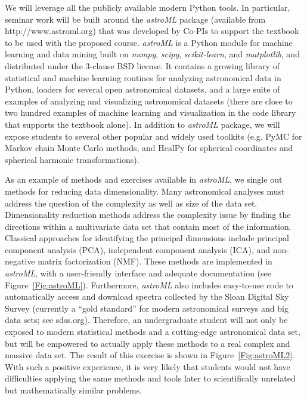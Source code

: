 We will leverage all the publicly available modern Python tools. In particular, seminar work will be 
built around the {\it astroML} package (available from http://www.astroml.org) that was developed 
by Co-PIs to support the textbook to be used with the proposed \astrocl course. {\it astroML} is a Python module 
for machine learning and data mining built on {\it numpy}, {\it scipy}, {\it scikit-learn}, and {\it matplotlib}, 
and distributed under the 3-clause BSD license. It contains a growing library of statistical and machine 
learning routines for analyzing astronomical data in Python, loaders for several open astronomical datasets, 
and a large suite of examples of analyzing and visualizing astronomical datasets (there are close to two 
hundred examples of machine learning and visualization in the code library that supports the textbook 
alone). In addition to  {\it astroML} package, we will expose students to several other popular and widely
used toolkits (e.g. PyMC for Markov chain Monte Carlo methods, and HealPy for spherical coordinates 
and spherical harmonic transformations). 

As an example of methods and exercises available in  {\it astroML}, we single out methods 
for reducing data dimensionality. Many astronomical analyses must address the question of the 
complexity as well as size of the data set. Dimensionality reduction methods address the
complexity issue  by finding the directions within a multivariate data set that contain most 
of the information. Classical approaches for identifying the principal dimensions include
principal component analysis (PCA), independent component analysis (ICA), and non-negative 
matrix factorization (NMF). These methods are implemented in   {\it astroML}, with a user-friendly 
interface and adequate documentation (see Figure~\ref{Fig:astroML}). Furthermore, {\it astroML} also 
includes easy-to-use code to automatically access and download spectra collected by the Sloan Digital 
Sky Survey (currently a ``gold standard'' for modern astronomical surveys and big data sets; see sdss.org). 
Therefore, an undergraduate student will not only be exposed to modern statistical methods
and a cutting-edge astronomical data set, but will be empowered to actually apply these methods 
to a real complex and massive data set.  The result of this exercise is shown in Figure~\ref{Fig:astroML2}. 
With such a positive experience, it is very likely that students would not have difficulties applying 
the same methods and tools later to scientifically unrelated but mathematically similar problems.  


